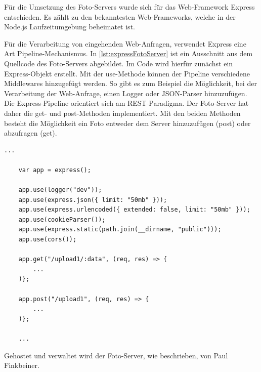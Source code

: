 \noindent{}

Für die Umsetzung des Foto-Servers wurde sich für das Web-Framework \glqq Express\grqq{} entschieden. Es zählt zu den bekanntesten Web-Frameworks, welche in der Node.js Laufzeitumgebung beheimatet ist.

Für die Verarbeitung von eingehenden Web-Anfragen, verwendet Express eine Art Pipeline-Mechanismus. In \autoref{lst:expressFotoServer} ist ein Ausschnitt aus dem Quellcode des Foto-Servers abgebildet. Im Code wird hierfür zunächst ein Express-Objekt erstellt. Mit der use-Methode können der Pipeline verschiedene Middlewares hinzugefügt werden. So gibt es zum Beispiel die Möglichkeit, bei der Verarbeitung der Web-Anfrage, einen Logger oder JSON-Parser hinzuzufügen. Die Express-Pipeline orientiert sich am REST-Paradigma. Der Foto-Server hat daher die get- und post-Methoden implementiert. Mit den beiden Methoden besteht die Möglichkeit ein Foto entweder dem Server hinzuzufügen (post) oder abzufragen (get).

\begin{lstlisting}[label=lst:expressFotoServer, caption={Codeausschnitt aus dem Foto-Server}, captionpos=b]
    ...

    var app = express();

    app.use(logger("dev"));
    app.use(express.json({ limit: "50mb" }));
    app.use(express.urlencoded({ extended: false, limit: "50mb" }));
    app.use(cookieParser());
    app.use(express.static(path.join(__dirname, "public")));
    app.use(cors());

    app.get("/upload1/:data", (req, res) => {
        ...
    )};

    app.post("/upload1", (req, res) => {
        ...
    )};

    ...
\end{lstlisting}

Gehostet und verwaltet wird der Foto-Server, wie beschrieben, von Paul Finkbeiner. 